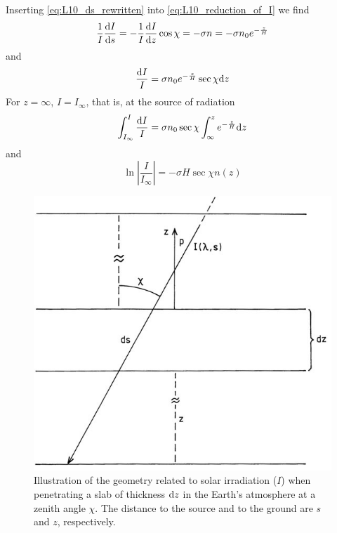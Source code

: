 Inserting \cref{eq:L10_ds_rewritten} into \cref{eq:L10_reduction_of_I} we find
\begin{equation*}
    \frac{1}{I}\fracd[s]{I}=-\frac{1}{I}\fracd[z]{I}\cos\chi=-\sigma n=-\sigma n_0e^{-\frac{z}{H}}
\end{equation*}
and
\begin{equation*}
    \frac{\tn{d}I}{I}=\sigma n_0e^{-\frac{z}{H}}\sec\chi\tn{d}z
\end{equation*}
For \(z=\infty \), \(I=I_\infty \), that is, at the source of radiation
\begin{equation*}
    \int_{I_\infty}^I\frac{\tn{d}I}{I}=\sigma n_0\sec\chi\int_\infty^{z}e^{-\frac{z}{H}}\tn{d}z
\end{equation*}
and
\begin{equation*}
    \ln\left|\frac{I}{I_\infty}\right|=-\sigma H\sec\chi n(z)
\end{equation*}
\begin{figure}[t]
    \centering
    \includegraphics[width=.4\linewidth]{bilder/L10_radiation_medium.jpg}
    \caption{Illustration of the geometry related to solar irradiation (\(I\)) when penetrating a slab of thickness \(\tn{d}z\) in the Earth’s atmosphere at a zenith angle \(\chi \). The distance to the source and to the ground are \(s\) and \(z\), respectively.}\label{fig:L10_radiation_medium}
\end{figure}

